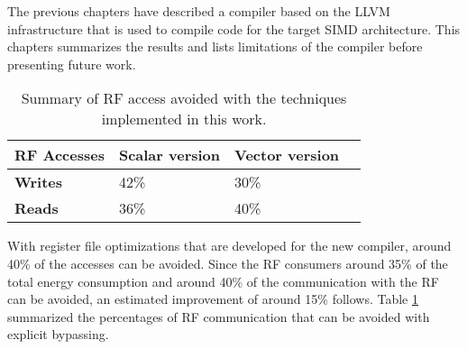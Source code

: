 The previous chapters have described a compiler based on the LLVM infrastructure that is used to compile code for the target SIMD architecture. This chapters summarizes the results and lists limitations of the compiler before presenting future work.

\begin{table}[H]
\caption{Summary of RF access avoided with the techniques implemented in this work.}
\begin{center}
\begin{tabular}{@{}l l l l@{}}
\toprule
\textbf{RF Accesses}	& \textbf{Scalar version}	& \textbf{Vector version}\\\hline
\textbf{Writes}		& 42\%				& 30\%		\\
\textbf{Reads}		& 36\%				& 40\%		\\
\bottomrule
\end{tabular}
\end{center}
\label{table:evaluation_results}
\end{table}%

%
With register file optimizations that are developed for the new compiler, around 40\% of the accesses can be avoided. Since the RF consumers around 35\% of the total energy consumption and around 40\% of the communication with the RF can be avoided, an estimated improvement of around 15\% follows. Table \ref{table:evaluation_results} summarized the percentages of RF communication that can be avoided with explicit bypassing.

